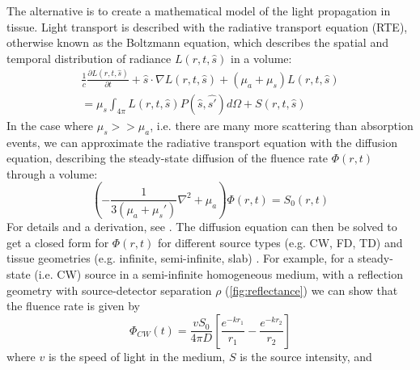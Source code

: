 The alternative is to create a mathematical model of the light propagation in tissue. Light transport is described with the radiative transport equation (RTE), otherwise known as the Boltzmann equation, which describes the spatial and temporal distribution of radiance $L(r,t,\hat{s})$ in a volume:
\begin{multline}\label{eq:RTE}
\frac{1}{c}\frac{\partial L(r,t,\hat{s})}{\partial t} + \hat{s}\cdot\nabla L(r,t,\hat{s}) + (\mu_a + \mu_s)L(r,t,\hat{s}) \\
=\mu_s\int_{4\pi}L(r,t,\hat{s})P(\hat{s},\hat{s'})d\Omega + S(r,t,\hat{s})
\end{multline}
In the case where $\mu_s >> \mu_a$, i.e. there are many more scattering than absorption events, we can approximate the radiative transport equation with the diffusion equation, describing the steady-state diffusion of the fluence rate $\Phi(r,t)$ through a volume:
\begin{equation}\label{eq:RTE_diffusion}
(-\frac{1}{3(\mu_a+\mu_s')}\nabla^2 + \mu_a)\Phi(r,t) = S_0(r,t)
\end{equation}
For details and a derivation, see \cite[ch. 3]{Madsen2013}. The diffusion equation can then be solved to get a closed form for $\Phi(r,t)$ for different source types (e.g. CW, FD, TD) and tissue geometries (e.g. infinite, semi-infinite, slab) \cite{Patterson1989, Farrell1992, Fantini1994, Kienle1997}. For example, for a steady-state (i.e. CW) source in a semi-infinite homogeneous medium, with a reflection geometry with source-detector separation $\rho$ (\autoref{fig:reflectance}) we can show that the fluence rate is given by
\begin{equation} \label{eq:flux_CW}
\Phi_{CW}(t) = \frac{vS_0}{4\pi D}
    \left[
        \frac{ e^{-kr_1} }{ r_1 }
       -\frac{ e^{-kr_2} }{ r_2 }
    \right]
\end{equation}
where $v$ is the speed of light in the medium, $S$ is the source intensity, and 

